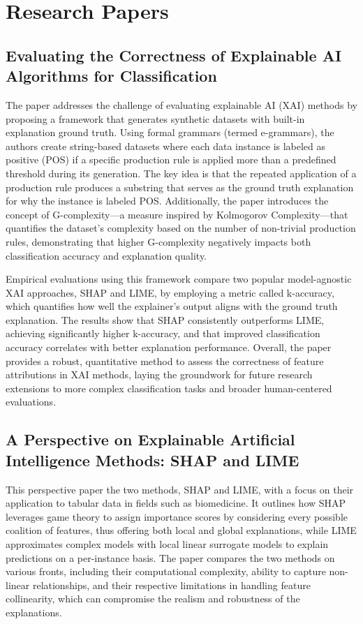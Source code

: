\documentclass{article}
\begin{document}
\section{Research Papers}
\subsection{Evaluating the Correctness of Explainable AI
Algorithms for Classification}
The paper addresses the challenge of evaluating explainable AI (XAI) methods by proposing a framework that generates synthetic datasets with built-in explanation ground truth. Using formal grammars (termed e-grammars), the authors create string-based datasets where each data instance is labeled as positive (POS) if a specific production rule is applied more than a predefined threshold during its generation. The key idea is that the repeated application of a production rule produces a substring that serves as the ground truth explanation for why the instance is labeled POS. Additionally, the paper introduces the concept of G-complexity—a measure inspired by Kolmogorov Complexity—that quantifies the dataset's complexity based on the number of non-trivial production rules, demonstrating that higher G-complexity negatively impacts both classification accuracy and explanation quality.

Empirical evaluations using this framework compare two popular model-agnostic XAI approaches, SHAP and LIME, by employing a metric called k-accuracy, which quantifies how well the explainer’s output aligns with the ground truth explanation. The results show that SHAP consistently outperforms LIME, achieving significantly higher k-accuracy, and that improved classification accuracy correlates with better explanation performance. Overall, the paper provides a robust, quantitative method to assess the correctness of feature attributions in XAI methods, laying the groundwork for future research extensions to more complex classification tasks and broader human-centered evaluations.

\subsection{A Perspective on Explainable Artificial Intelligence Methods: SHAP
and LIME}
This perspective paper the two methods, SHAP and LIME, with a focus on their application to tabular data in fields such as biomedicine. It outlines how SHAP leverages game theory to assign importance scores by considering every possible coalition of features, thus offering both local and global explanations, while LIME approximates complex models with local linear surrogate models to explain predictions on a per-instance basis. The paper compares the two methods on various fronts, including their computational complexity, ability to capture non-linear relationships, and their respective limitations in handling feature collinearity, which can compromise the realism and robustness of the explanations.
\end{document}
